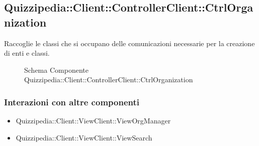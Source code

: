 \subsection{Quizzipedia::Client::ControllerClient::CtrlOrganization}
Raccoglie le classi che si occupano delle comunicazioni necessarie per la creazione di enti e classi.
\begin{figure}[H]
\centering
\noindent{}
\caption[Quizzipedia::Client::ControllerClient::CtrlOrganization]{Schema Componente Quizzipedia::Client::ControllerClient::CtrlOrganization}
\end{figure}
\subsubsection{Interazioni con altre componenti}
\begin{itemize}
\item Quizzipedia::Client::ViewClient::ViewOrgManager
\item Quizzipedia::Client::ViewClient::ViewSearch
\end{itemize}
